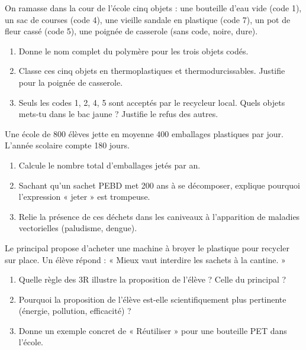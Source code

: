 \documentclass[11pt]{article}
\begin{document}
\begin{exercice}
On ramasse dans la cour de l'école cinq objets : une bouteille d'eau vide (code 1), un sac de courses (code 4), une vieille sandale en plastique (code 7), un pot de fleur cassé (code 5), une poignée de casserole (sans code, noire, dure).
\begin{enumerate}
\item Donne le nom complet du polymère pour les trois objets codés.
\item Classe ces cinq objets en thermoplastiques et thermodurcissables. Justifie pour la poignée de casserole.
\item Seuls les codes 1, 2, 4, 5 sont acceptés par le recycleur local. Quels objets mets-tu dans le bac jaune ? Justifie le refus des autres.
\end{enumerate}
\end{exercice}

\begin{exercice}
Une école de \num{800} élèves jette en moyenne \num{400} emballages plastiques par jour. L'année scolaire compte \num{180} jours.
\begin{enumerate}
\item Calcule le nombre total d'emballages jetés par an.
\item Sachant qu'un sachet PEBD met \num{200} ans à se décomposer, explique pourquoi l'expression « jeter » est trompeuse.
\item Relie la présence de ces déchets dans les caniveaux à l'apparition de maladies vectorielles (paludisme, dengue).
\end{enumerate}
\end{exercice}

\begin{exercice}[Argumentation 3R]
Le principal propose d'acheter une machine à broyer le plastique pour recycler sur place. Un élève répond : « Mieux vaut interdire les sachets à la cantine. »
\begin{enumerate}
\item Quelle règle des 3R illustre la proposition de l'élève ? Celle du principal ?
\item Pourquoi la proposition de l'élève est-elle scientifiquement plus pertinente (énergie, pollution, efficacité) ?
\item Donne un exemple concret de « Réutiliser » pour une bouteille PET dans l'école.
\end{enumerate}
\end{exercice}
\end{document}
